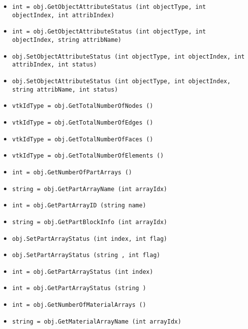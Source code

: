 \begin{itemize}
\item  \verb|int = obj.GetObjectAttributeStatus (int objectType, int objectIndex, int attribIndex)|

\item  \verb|int = obj.GetObjectAttributeStatus (int objectType, int objectIndex, string attribName)|

\item  \verb|obj.SetObjectAttributeStatus (int objectType, int objectIndex, int attribIndex, int status)|

\item  \verb|obj.SetObjectAttributeStatus (int objectType, int objectIndex, string attribName, int status)|

\item  \verb|vtkIdType = obj.GetTotalNumberOfNodes ()|

\item  \verb|vtkIdType = obj.GetTotalNumberOfEdges ()|

\item  \verb|vtkIdType = obj.GetTotalNumberOfFaces ()|

\item  \verb|vtkIdType = obj.GetTotalNumberOfElements ()|

\item  \verb|int = obj.GetNumberOfPartArrays ()|

\item  \verb|string = obj.GetPartArrayName (int arrayIdx)|

\item  \verb|int = obj.GetPartArrayID (string name)|

\item  \verb|string = obj.GetPartBlockInfo (int arrayIdx)|

\item  \verb|obj.SetPartArrayStatus (int index, int flag)|

\item  \verb|obj.SetPartArrayStatus (string , int flag)|

\item  \verb|int = obj.GetPartArrayStatus (int index)|

\item  \verb|int = obj.GetPartArrayStatus (string )|

\item  \verb|int = obj.GetNumberOfMaterialArrays ()|

\item  \verb|string = obj.GetMaterialArrayName (int arrayIdx)|


\end{itemize}
